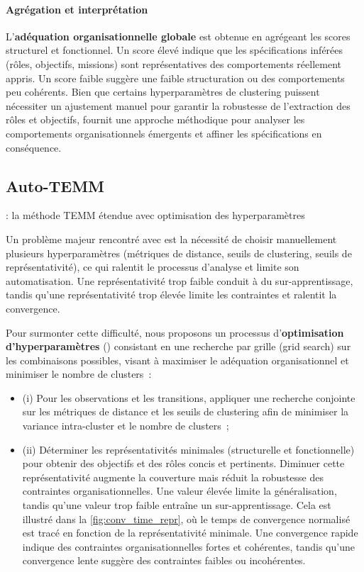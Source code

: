 \paragraph{Agrégation et interprétation}
L'\textbf{adéquation organisationnelle globale} est obtenue en agrégeant les scores structurel et fonctionnel.
Un score élevé indique que les spécifications inférées (rôles, objectifs, missions) sont représentatives des comportements réellement appris.
Un score faible suggère une faible structuration ou des comportements peu cohérents.
Bien que certains hyperparamètres de clustering puissent nécessiter un ajustement manuel pour garantir la robustesse de l'extraction des rôles et objectifs,  fournit une approche méthodique pour analyser les comportements organisationnels émergents et affiner les spécifications en conséquence.


\subsection{Auto-TEMM} : la méthode TEMM étendue avec optimisation des hyperparamètres

Un problème majeur rencontré avec  est la nécessité de choisir manuellement plusieurs hyperparamètres (métriques de distance, seuils de clustering, seuils de représentativité), ce qui ralentit le processus d'analyse et limite son automatisation. Une représentativité trop faible conduit à du sur-apprentissage, tandis qu'une représentativité trop élevée limite les contraintes et ralentit la convergence.


Pour surmonter cette difficulté, nous proposons un processus d'\textbf{optimisation d'hyperparamètres} () consistant en une recherche par grille (grid search) sur les combinaisons possibles, visant à maximiser le adéquation  organisationnel et minimiser le nombre de clusters~:

\begin{itemize}
  \item (i) Pour les observations et les transitions, appliquer une recherche conjointe sur les métriques de distance et les seuils de clustering afin de minimiser la variance intra-cluster et le nombre de clusters~;
  \item (ii) Déterminer les représentativités minimales (structurelle et fonctionnelle) pour obtenir des objectifs et des rôles concis et pertinents. Diminuer cette représentativité augmente la couverture mais réduit la robustesse des contraintes organisationnelles. Une valeur élevée limite la généralisation, tandis qu'une valeur trop faible entraîne un sur-apprentissage. Cela est illustré dans la \autoref{fig:conv_time_repr}, où le temps de convergence normalisé est tracé en fonction de la représentativité minimale. Une convergence rapide indique des contraintes organisationnelles fortes et cohérentes, tandis qu'une convergence lente suggère des contraintes faibles ou incohérentes.
\end{itemize}

